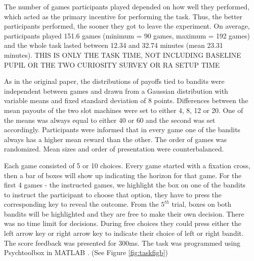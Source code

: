 \documentclass[12pt]{article}
\begin{document}
	The number of games participants played depended on how well they performed, which acted as the primary incentive for performing the task. Thus, the better participants performed, the sooner they got to leave the experiment. On average, participants played 151.6 games (minimum = 90 games, maximum = 192 games) and the whole task lasted between 12.34 and 32.74 minutes (mean 23.31 minutes).%
	THIS IS ONLY THE TASK TIME, NOT INCLUDING BASELINE PUPIL OR THE TWO CURIOSITY SURVEY OR RA SETUP TIME
	
	As in the original paper, the distributions of payoffs tied to bandits were independent between games and drawn from a Gaussian distribution with variable means and fixed standard deviation of 8 points. Differences between the mean payouts of the two slot machines were set to either 4, 8, 12 or 20. One of the means was always equal to either 40 or 60 and the second was set accordingly. Participants were informed that in every game one of the bandits always has a higher mean reward than the other. The order of games was randomized. Mean sizes and order of presentation were counterbalanced. 
	
	Each game consisted of 5 or 10 choices. Every game started with a fixation cross, then a bar of boxes will show up indicating the horizon for that game. For the first 4 games - the instructed games, we highlight the box on one of the bandits to instruct the participant to choose that option, they have to press the corresponding key to reveal the outcome. From the $5^{th}$ trial, boxes on both bandits will be highlighted and they are free to make their own decision. There was no time limit for decisions. During free choices they could press either the left arrow key or right arrow key to indicate their choice of left or right bandit. The score feedback was presented for 300ms. The task was programmed using Psychtoolbox in MATLAB \citep{psychtoolbox1, psychtoolbox2}. (See Figure \ref{fig:taskfigb})
	
\end{document}
